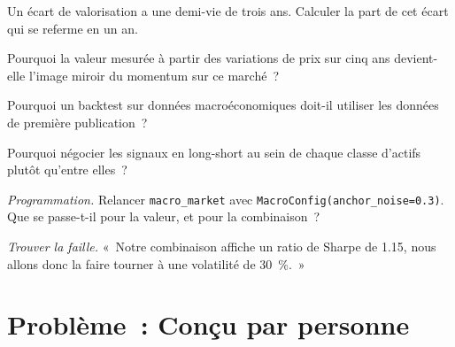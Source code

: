 \begin{exercise}[$\star$]\label{exo:s2:systematic-macro:3}
Un écart de valorisation a une demi-vie de trois ans. Calculer la part de cet écart qui se referme en un an.
\end{exercise}

\begin{exercise}[$\star\star$]\label{exo:s2:systematic-macro:4}
Pourquoi la valeur mesurée à partir des variations de prix sur cinq ans devient-elle l'image miroir du momentum sur ce marché~?
\end{exercise}

\begin{exercise}[$\star\star$]\label{exo:s2:systematic-macro:5}
Pourquoi un backtest sur données macroéconomiques doit-il utiliser les données de première publication~?
\end{exercise}

\begin{exercise}[$\star\star$]\label{exo:s2:systematic-macro:6}
Pourquoi négocier les signaux en long-short au sein de chaque classe d'actifs plutôt qu'entre elles~?
\end{exercise}

\begin{exercise}[$\star\star\star$]\label{exo:s2:systematic-macro:7}
\emph{Programmation.} Relancer \texttt{macro\_market} avec \texttt{MacroConfig(anchor\_noise=0.3)}. Que se passe-t-il pour la valeur, et pour la combinaison~?
\end{exercise}

\begin{exercise}[$\star\star\star$]\label{exo:s2:systematic-macro:8}
\emph{Trouver la faille.} «~Notre combinaison affiche un ratio de Sharpe de 1.15, nous allons donc la faire tourner à une volatilité de 30~\%.~»
\end{exercise}

\section{Problème~: Conçu par personne}

